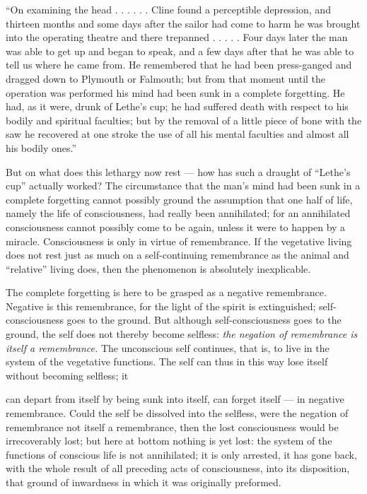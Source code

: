 \documentclass[12pt,a4paper]{book}
\begin{document}
``On examining the head . . . . . . Cline found a perceptible depression, and
thirteen months and some days after the sailor had come to harm he was brought
into the operating theatre and there trepanned . . . . . Four days later the man
was able to get up and began to speak, and a few days after that he was able to
tell us where he came from. He remembered that he had been press-ganged and
dragged down to Plymouth or Falmouth; but from that moment until the operation
was performed his mind had been sunk in a complete forgetting. He had, as it
were, drunk of Lethe's cup; he had suffered death with respect to his bodily and
spiritual faculties; but by the removal of a little piece of bone with the saw he
recovered at one stroke the use of all his mental faculties and almost all his
bodily ones.''

But on what does this lethargy now rest --- how has such a draught of ``Lethe's
cup'' actually worked? The circumstance that the man's mind had been sunk in a
complete forgetting cannot possibly ground the assumption that one half of life,
namely the life of consciousness, had really been annihilated; for an annihilated
consciousness cannot possibly come to be again, unless it were to happen by a
miracle. Consciousness is only in virtue of remembrance. If the vegetative living
does not rest just as much on a self-continuing remembrance as the animal and
``relative'' living does, then the phenomenon is absolutely inexplicable.

The complete forgetting is here to be grasped as a negative remembrance. Negative
is this remembrance, for the light of the spirit is extinguished; self-consciousness
goes to the ground. But although self-consciousness goes to the ground, the self
does not thereby become selfless: \emph{the negation of remembrance is itself a
remembrance.} The unconscious self continues, that is, to live in the system of
the vegetative functions. The self can thus in this way lose itself without
becoming selfless; it

can depart from itself by being sunk into itself, can forget itself --- in
negative remembrance. Could the self be dissolved into the selfless, were the
negation of remembrance not itself a remembrance, then the lost consciousness
would be irrecoverably lost; but here at bottom nothing is yet lost: the system
of the functions of conscious life is not annihilated; it is only arrested, it
has gone back, with the whole result of all preceding acts of consciousness, into
its disposition, that ground of inwardness in which it was originally
preformed.
\end{document}
